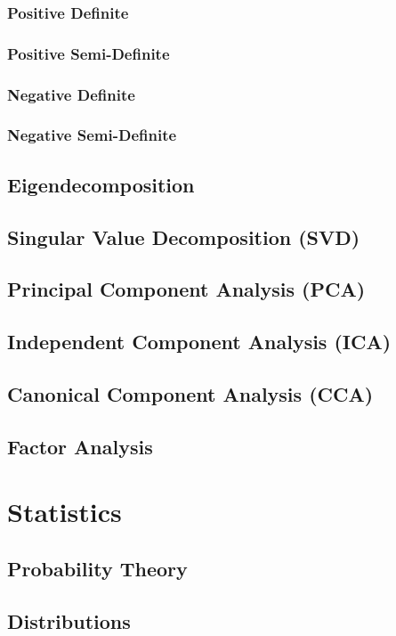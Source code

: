 \documentclass[11pt]{article}
\begin{document}
\subsubsection{Positive Definite}
\subsubsection{Positive Semi-Definite}
\subsubsection{Negative Definite}
\subsubsection{Negative Semi-Definite}
\subsection{Eigendecomposition}
\subsection{Singular Value Decomposition (SVD)}
\subsection{Principal Component Analysis (PCA)}
\subsection{Independent Component Analysis (ICA)}
\subsection{Canonical Component Analysis (CCA)}
\subsection{Factor Analysis}

\section{Statistics}
\subsection{Probability Theory}
\subsection{Distributions}
\end{document}
